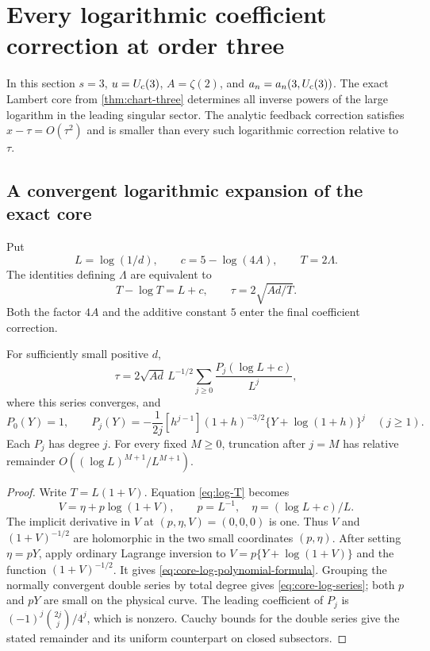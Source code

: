 \section{Every logarithmic coefficient correction at order three}
\label{sec:logarithmic}

In this section $s=3$, $u=U_{\mathrm c}(3)$, $A=\zeta(2)$, and
$a_n=a_n(3,U_{\mathrm c}(3))$.  The exact Lambert core from
\cref{thm:chart-three} determines all inverse powers of the large
logarithm in the leading singular sector.  The analytic feedback
correction satisfies $x-\tau=O(\tau^2)$ and is smaller than every
such logarithmic correction relative to $\tau$.

\subsection{A convergent logarithmic expansion of the exact core}

Put
\begin{equation}\label{eq:log-core-parameters}
 L=\log(1/d),\qquad c=5-\log(4A),\qquad T=2\Lambda.
\end{equation}
The identities defining $\Lambda$ are equivalent to
\begin{equation}\label{eq:log-T}
 T-\log T=L+c,\qquad \tau=2\sqrt{Ad/T}.
\end{equation}
Both the factor $4A$ and the additive constant $5$ enter the final
coefficient correction.

\begin{proposition}
\label{prop:core-log-polynomials}
For sufficiently small positive $d$,
\begin{equation}\label{eq:core-log-series}
 \tau=2\sqrt{Ad}\,L^{-1/2}
 \sum_{j\ge0}\frac{P_j(\log L+c)}{L^j},
\end{equation}
where this series converges, and
\begin{equation}\label{eq:core-log-polynomial-formula}
 P_0(Y)=1,\qquad
 P_j(Y)=-\frac1{2j}[h^{j-1}]
 (1+h)^{-3/2}\{Y+\log(1+h)\}^{j}\quad(j\ge1).
\end{equation}
Each $P_j$ has degree $j$.  For every fixed $M\ge0$, truncation
after $j=M$ has relative remainder
$O((\log L)^{M+1}/L^{M+1})$.
\end{proposition}

\begin{proof}
Write $T=L(1+V)$.  Equation \eqref{eq:log-T} becomes
\[
 V=\eta+p\log(1+V),\qquad
 p=L^{-1},\quad \eta=(\log L+c)/L.
\]
The implicit derivative in $V$ at $(p,\eta,V)=(0,0,0)$ is one.
Thus $V$ and $(1+V)^{-1/2}$ are holomorphic in the two small
coordinates $(p,\eta)$.  After setting $\eta=pY$, apply ordinary
Lagrange inversion to $V=p\{Y+\log(1+V)\}$ and the function
$(1+V)^{-1/2}$.  It gives
\eqref{eq:core-log-polynomial-formula}.
Grouping the normally convergent double series by total degree gives
\eqref{eq:core-log-series}; both $p$ and $pY$ are small on the physical
curve.  The leading coefficient of $P_j$ is
$(-1)^j\binom{2j}{j}/4^j$, which is nonzero.
Cauchy bounds for the double series give the stated remainder and its
uniform counterpart on closed subsectors.
\end{proof}

